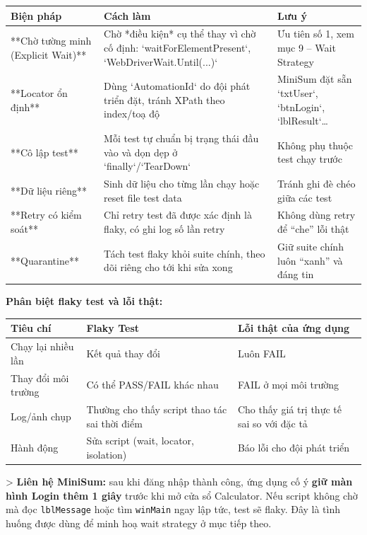 \begin{table}[H]
\centering
\begin{tabular}{|l|l|l|}
\hline
\textbf{Biện pháp} & \textbf{Cách làm} & \textbf{Lưu ý} \\ \hline
**Chờ tường minh (Explicit Wait)** & Chờ *điều kiện* cụ thể thay vì chờ cố định: `waitForElementPresent`, `WebDriverWait.Until(...)` & Ưu tiên số 1, xem mục 9 – Wait Strategy \\ \hline
**Locator ổn định** & Dùng `AutomationId` do đội phát triển đặt, tránh XPath theo index/toạ độ & MiniSum đặt sẵn `txtUser`, `btnLogin`, `lblResult`… \\ \hline
**Cô lập test** & Mỗi test tự chuẩn bị trạng thái đầu vào và dọn dẹp ở `finally`/`TearDown` & Không phụ thuộc test chạy trước \\ \hline
**Dữ liệu riêng** & Sinh dữ liệu cho từng lần chạy hoặc reset file test data & Tránh ghi đè chéo giữa các test \\ \hline
**Retry có kiểm soát** & Chỉ retry test đã được xác định là flaky, có ghi log số lần retry & Không dùng retry để “che” lỗi thật \\ \hline
**Quarantine** & Tách test flaky khỏi suite chính, theo dõi riêng cho tới khi sửa xong & Giữ suite chính luôn “xanh” và đáng tin \\ \hline
\end{tabular}
\end{table}




\textbf{Phân biệt flaky test và lỗi thật:}

\begin{table}[H]
\centering
\begin{tabular}{|l|l|l|}
\hline
\textbf{Tiêu chí} & \textbf{Flaky Test} & \textbf{Lỗi thật của ứng dụng} \\ \hline
Chạy lại nhiều lần & Kết quả thay đổi & Luôn FAIL \\ \hline
Thay đổi môi trường & Có thể PASS/FAIL khác nhau & FAIL ở mọi môi trường \\ \hline
Log/ảnh chụp & Thường cho thấy script thao tác sai thời điểm & Cho thấy giá trị thực tế sai so với đặc tả \\ \hline
Hành động & Sửa script (wait, locator, isolation) & Báo lỗi cho đội phát triển \\ \hline
\end{tabular}
\end{table}




> \textbf{Liên hệ MiniSum:} sau khi đăng nhập thành công, ứng dụng cố ý \textbf{giữ màn hình Login thêm 1 giây} trước khi mở cửa sổ Calculator. Nếu script không chờ mà đọc \texttt{lblMessage} hoặc tìm \texttt{winMain} ngay lập tức, test sẽ flaky. Đây là tình huống được dùng để minh hoạ wait strategy ở mục tiếp theo.



